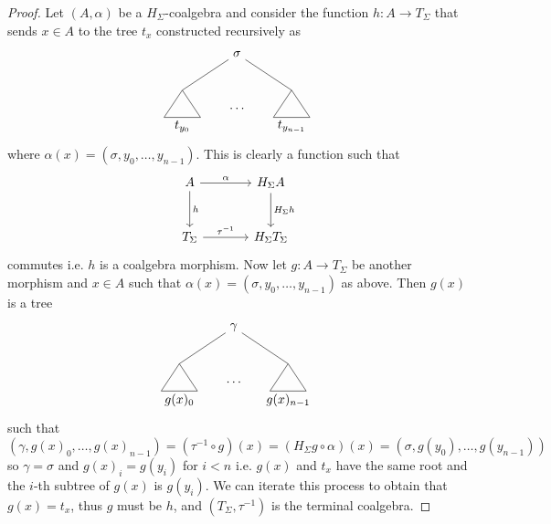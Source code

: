\documentclass[letterpaper, 11pt, oneside]{memoir}
\theoremstyle{myteo}
\numberwithin{equation}{section}
\begin{document}
\begin{proof}
  Let \((A, \alpha)\) be a \(H_\Sigma\)-coalgebra and consider the function \(h: A \to T_\Sigma\) that sends \(x \in A\) to the tree \(t_x\) constructed recursively as
  \begin{equation*}
    \begin{tikzpicture}
      \node (t1) at (0,-0.5){\(t_{y_0}\)};
      \node (t2) at (1.5,0){\(\ldots\)};
      \node (t3) at (3,-0.5){\(t_{y_{n-1}}\)};
      \node (s) at (1.5, 1.5){\(\sigma\)};
      
      \draw[-] (0,0.5) -- (.5, -.25) -- (-.5, -.25) -- (0, .5);
      \draw[-] (3,0.5) -- (3.5, -.25) -- (2.5, -.25) -- (3, .5);

      \draw[-] (s) -- (0,0.5);
      \draw[-] (s) -- (3,0.5);
    \end{tikzpicture}
  \end{equation*}
  where \(\alpha(x) = (\sigma, y_0, \ldots, y_{n-1})\).
  This is clearly a function such that
  \begin{equation*}
    \begin{tikzcd}[sep=large]
      A \ar[r, "\alpha"] \ar[d, "h"] & H_\Sigma A \ar[d, "H_\Sigma h"] \\
      T_\Sigma \ar[r, "\tau^{-1}"] & H_\Sigma T_\Sigma
    \end{tikzcd}
  \end{equation*}
  commutes i.e. \(h\) is a coalgebra morphism.
  Now let \(g:A \to T_\Sigma\) be another morphism and \(x \in A\) such that \(\alpha(x) = (\sigma, y_0, \ldots, y_{n-1})\) as above.
  Then \(g(x)\) is a tree
  \begin{equation*}
    \begin{tikzpicture}
      \node (t1) at (0,-0.5){\(g(x)_0\)};
      \node (t2) at (1.5,0){\(\ldots\)};
      \node (t3) at (3,-0.5){\(g(x)_{n-1}\)};
      \node (s) at (1.5, 1.5){\(\gamma\)};
      
      \draw[-] (0,0.5) -- (.5, -.25) -- (-.5, -.25) -- (0, .5);
      \draw[-] (3,0.5) -- (3.5, -.25) -- (2.5, -.25) -- (3, .5);

      \draw[-] (s) -- (0,0.5);
      \draw[-] (s) -- (3,0.5);
    \end{tikzpicture}
  \end{equation*}
  such that
  \begin{equation*}
    (\gamma, g(x)_0, \ldots, g(x)_{n-1}) = (\tau^{-1} \circ g)(x) = (H_\Sigma g \circ \alpha)(x) = (\sigma, g(y_0), \ldots, g(y_{n-1}))
  \end{equation*}
  so \(\gamma = \sigma\) and \(g(x)_i = g(y_i)\) for \(i < n\) i.e. \(g(x)\) and \(t_x\) have the same root and the \(i\)-th subtree of \(g(x)\) is \(g(y_i)\).
  We can iterate this process to obtain that \(g(x) = t_x\), thus \(g\) must be \(h\), and \((T_\Sigma, \tau^{-1})\) is the terminal coalgebra.
\end{proof}
\end{document}
